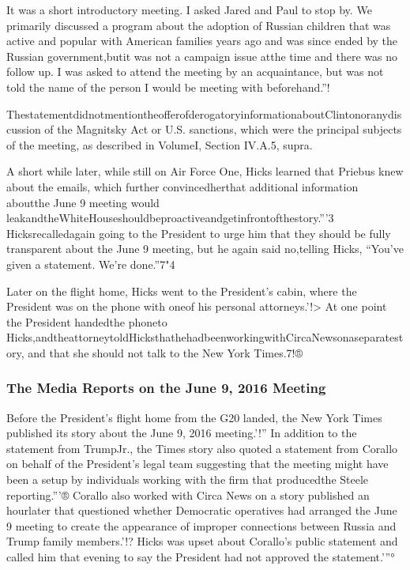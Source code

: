 It was a short introductory meeting. I asked Jared and Paul to stop by. We primarily discussed a program about the adoption of Russian children that was active and popular with American families years ago and was since ended by the Russian government,butit was not a campaign issue atthe time and there was no follow up. I was asked to attend the meeting by an acquaintance, but was not told the name of the person I would be meeting with beforehand.”!

ThestatementdidnotmentiontheofferofderogatoryinformationaboutClintonoranydiscussion of the Magnitsky Act or U.S. sanctions, which were the principal subjects of the meeting, as described in VolumeI, Section IV.A.5, supra.

A short while later, while still on Air Force One, Hicks learned that Priebus knew about the emails, which further convincedherthat additional information aboutthe June 9 meeting would leakandtheWhiteHouseshouldbeproactiveandgetinfrontofthestory.”'3 Hicksrecalledagain going to the President to urge him that they should be fully transparent about the June 9 meeting, but he again said no,telling Hicks, “You’ve given a statement. We’re done.”7"4

Later on the flight home, Hicks went to the President’s cabin, where the President was on the phone with oneof his personal attorneys.’!> At one point the President handedthe phoneto Hicks,andtheattorneytoldHicksthathehadbeenworkingwithCircaNewsonaseparatestory, and that she should not talk to the New York Times.7!®

\subsubsection{The Media Reports on the June 9, 2016 Meeting}

Before the President’s flight home from the G20 landed, the New York Times published its story about the June 9, 2016 meeting.’!” In addition to the statement from TrumpJr., the Times story also quoted a statement from Corallo on behalf of the President’s legal team suggesting that the meeting might have been a setup by individuals working with the firm that producedthe Steele reporting.”'® Corallo also worked with Circa News on a story published an hourlater that questioned whether Democratic operatives had arranged the June 9 meeting to create the appearance of improper connections between Russia and Trump family members.’!? Hicks was upset about Corallo’s public statement and called him that evening to say the President had not approved the statement.’”°

